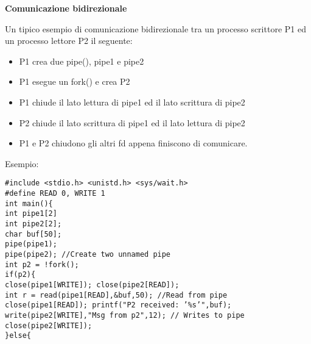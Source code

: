 \begin{flushleft}
\begin{flushleft}
\begin{flushleft}
\begin{flushleft}
      \end{flushleft}
    \end{flushleft}
    \begin{flushleft}
      \textbf{Comunicazione bidirezionale}\par
      Un tipico esempio di comunicazione bidirezionale tra un processo scrittore P1 ed un 
      processo lettore P2 \ace il seguente:
      \begin{itemize}
        \item P1 crea due pipe(), pipe1 e pipe2
        \item P1 esegue un fork() e crea P2
        \item P1 chiude il lato lettura di pipe1 ed il lato scrittura di pipe2
        \item P2 chiude il lato scrittura di pipe1 ed il lato lettura di pipe2
        \item P1 e P2 chiudono gli altri fd appena finiscono di comunicare.
      \end{itemize}
      Esempio:
      \begin{flushleft}
        \texttt{\#include <stdio.h> <unistd.h> <sys/wait.h>\\
                \#define READ 0, WRITE 1 \\
                int main()\{ \\
                \halftab int pipe1[2] \\ 
                \halftab int pipe2[2];\\
                \halftab char buf[50];\\
                \halftab pipe(pipe1); \\
                \halftab pipe(pipe2); //Create two unnamed pipe\\
                \halftab int p2 = !fork();\\
                \halftab if(p2)\{ \\
                \tab close(pipe1[WRITE]); close(pipe2[READ]);\\
                \tab int r = read(pipe1[READ],\&buf,50); //Read from pipe\\
                \tab close(pipe1[READ]); printf("P2 received: '\%s'\n",buf);\\
                \tab write(pipe2[WRITE],"Msg from p2",12); // Writes to pipe\\
                \tab close(pipe2[WRITE]);\\
                \halftab \}else\{\\
}
\end{flushleft}
\end{flushleft}
\end{flushleft}
\end{flushleft}
